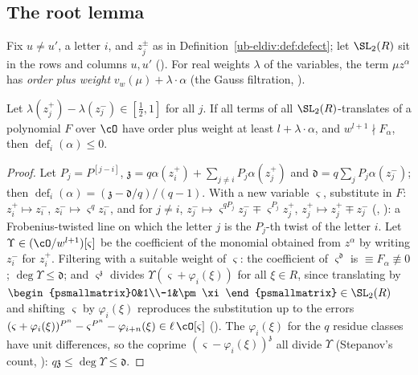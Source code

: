 \subsection{The root lemma}\label{ub-eldiv:sec:root}

Fix $u\ne u'$, a letter $i$, and $z^\pm_j$ as in Definition~\ref{ub-eldiv:def:defect}; let
$\SL_2(R)$ sit in the rows and columns $u,u'$ (). For real weights $\lambda$ of
the variables, the term $\mu z^\alpha$ has \emph{order plus weight} $v_w(\mu)+\lambda\cdot\alpha$
(the Gauss filtration, ).

\begin{theorem}
\label{ub-eldiv:thm:root}
Let $\lambda(z^+_j)-\lambda(z^-_j)\in[\frac12,1]$ for all $j$. If all terms of all
$\SL_2(R)$-translates of a polynomial $F$ over $\cO$ have order plus weight at least
$l+\lambda\cdot\alpha$, and $w^{l+1}\nmid F_\alpha$, then $\operatorname{def}_i(\alpha)\le0$.
\end{theorem}

\begin{proof}
Let $P_j=P^{[j-i]}$, $\mathfrak z=q\alpha(z^+_i)+\sum_{j\ne i}P_j\alpha(z^+_j)$ and
$\mathfrak d=q\sum_jP_j\alpha(z^-_j)$; then $\operatorname{def}_i(\alpha)=(\mathfrak z-\mathfrak
d/q)/(q-1)$. With a new variable $\varsigma$, substitute in $F$: $z^+_i\mapsto z^-_i$,
$z^-_i\mapsto\varsigma^qz^-_i$, and for $j\ne i$, $z^-_j\mapsto\varsigma^{qP_j}z^-_j\mp\varsigma^{P_j}z^+_j$, $z^+_j\mapsto z^+_j\mp z^-_j$
(, ): a
Frobenius-twisted line on which the letter $j$ is the $P_j$-th twist of the letter $i$. Let
$\Upsilon\in(\cO/w^{l+1})[\varsigma]$ be the coefficient of the monomial obtained from $z^\alpha$ by
writing $z^-_i$ for $z^+_i$. Filtering with a suitable weight of $\varsigma$: the coefficient of
$\varsigma^{\mathfrak d}$ is $\equiv F_\alpha\not\equiv0$; $\deg\Upsilon\le\mathfrak d$; and
$\varsigma^{\mathfrak z}$ divides $\Upsilon(\varsigma+\varphi_i(\xi))$ for all $\xi\in R$, since
translating by $\begin{psmallmatrix}0&1\\-1&\pm\xi\end{psmallmatrix}\in\SL_2(R)$ and shifting
$\varsigma$ by $\varphi_i(\xi)$ reproduces the substitution up to the errors
$(\varsigma+\varphi_i(\xi))^{P^n}-\varsigma^{P^n}-\varphi_{i+n}(\xi)\in \ell\,\cO[\varsigma]$
(). The $\varphi_i(\xi)$ for
the $q$ residue classes have unit differences, so the coprime $(\varsigma-\varphi_i(\xi))^{\mathfrak
z}$ all divide $\Upsilon$ (Stepanov's count, ):
$q\mathfrak z\le\deg\Upsilon\le\mathfrak d$.
\end{proof}

